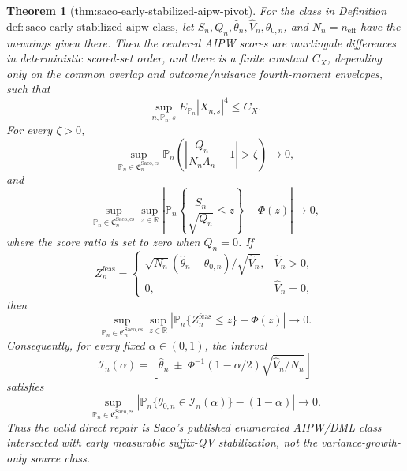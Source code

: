 \documentclass{article}
\newtheorem{theorem}{Theorem}
\begin{document}
\begin{theorem}[thm:saco-early-stabilized-aipw-pivot]\label{thm:saco-early-stabilized-aipw-pivot}
For the class in Definition~\(\mathrm{def:saco\text{-}early\text{-}stabilized\text{-}aipw\text{-}class}\), let \(S_n,Q_n,\widehat\theta_n,\widehat V_n,\theta_{0,n}\), and \(N_n=n_{\mathrm{eff}}\) have the meanings given there.  Then the centered AIPW scores are martingale differences in deterministic scored-set order, and there is a finite constant \(C_X\), depending only on the common overlap and outcome/nuisance fourth-moment envelopes, such that
\[
\sup_{n,\mathbb P_n,s}E_{\mathbb P_n}|X_{n,s}|^4\le C_X.
\]
For every \(\zeta>0\),
\[
\sup_{\mathbb P_n\in\mathfrak C_n^{\mathrm{Saco,es}}}
\mathbb P_n\left(\left|\frac{Q_n}{N_n\Lambda_n}-1\right|>\zeta\right)\longrightarrow0,
\]
and
\[
\sup_{\mathbb P_n\in\mathfrak C_n^{\mathrm{Saco,es}}}\sup_{z\in\mathbb R}
\left|\mathbb P_n\left\{\frac{S_n}{\sqrt{Q_n}}\le z\right\}-\Phi(z)\right|\longrightarrow0,
\]
where the score ratio is set to zero when \(Q_n=0\).  If
\[
Z_n^{\mathrm{feas}}=
\begin{cases}
\sqrt{N_n}(\widehat\theta_n-\theta_{0,n})/\sqrt{\widehat V_n},&\widehat V_n>0,\\
0,&\widehat V_n=0,
\end{cases}
\]
then
\[
\sup_{\mathbb P_n\in\mathfrak C_n^{\mathrm{Saco,es}}}\sup_{z\in\mathbb R}
\left|\mathbb P_n\{Z_n^{\mathrm{feas}}\le z\}-\Phi(z)\right|\longrightarrow0.
\]
Consequently, for every fixed \(\alpha\in(0,1)\), the interval
\[
\mathcal I_n(\alpha)=\left[\widehat\theta_n\ \pm\ \Phi^{-1}(1-\alpha/2)\sqrt{\widehat V_n/N_n}\right]
\]
satisfies
\[
\sup_{\mathbb P_n\in\mathfrak C_n^{\mathrm{Saco,es}}}
\left|\mathbb P_n\{\theta_{0,n}\in\mathcal I_n(\alpha)\}-(1-\alpha)\right|\longrightarrow0.
\]
Thus the valid direct repair is Saco's published enumerated AIPW/DML class intersected with early measurable suffix-QV stabilization, not the variance-growth-only source class.
\end{theorem}
\end{document}
